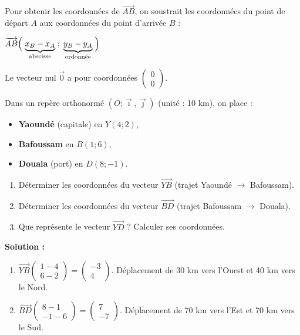 \documentclass[11pt]{article}
\begin{document}
\begin{aretenir}
    Pour obtenir les coordonnées de $\overrightarrow{AB}$, on soustrait les coordonnées du point de départ $A$ aux coordonnées du point d'arrivée $B$ :
    \begin{center}
    $\overrightarrow{AB}\Bigl(\; \underbrace{x_B-x_A}_{\text{abscisse}} \;;\; \underbrace{y_B-y_A}_{\text{ordonnée}} \;\Bigr)$
    \end{center}
    Le vecteur nul $\vec{0}$ a pour coordonnées $\begin{pmatrix} 0 \\ 0 \end{pmatrix}$.
\end{aretenir}

\begin{exemplebox}
    Dans un repère orthonormé $(O;\vec{\imath},\vec{\jmath})$ (unité : 10 km), on place :
    \begin{itemize}
        \item \textbf{Yaoundé} (capitale) en $Y(4;2)$,
        \item \textbf{Bafoussam} en $B(1;6)$,
        \item \textbf{Douala} (port) en $D(8;-1)$.
    \end{itemize}
    \begin{enumerate}
        \item Déterminer les coordonnées du vecteur $\overrightarrow{YB}$ (trajet Yaoundé $\to$ Bafoussam).
        \item Déterminer les coordonnées du vecteur $\overrightarrow{BD}$ (trajet Bafoussam $\to$ Douala).
        \item Que représente le vecteur $\overrightarrow{YD}$ ? Calculer ses coordonnées.
    \end{enumerate}
    \tcblower
    \textbf{Solution :}
    \begin{enumerate}
        \item $\overrightarrow{YB}\begin{pmatrix} 1-4 \\ 6-2 \end{pmatrix} = \begin{pmatrix} -3 \\ 4 \end{pmatrix}$. Déplacement de 30 km vers l'Ouest et 40 km vers le Nord.
        \item $\overrightarrow{BD}\begin{pmatrix} 8-1 \\ -1-6 \end{pmatrix} = \begin{pmatrix} 7 \\ -7 \end{pmatrix}$. Déplacement de 70 km vers l'Est et 70 km vers le Sud.

\end{enumerate}
\end{exemplebox}
\end{document}
